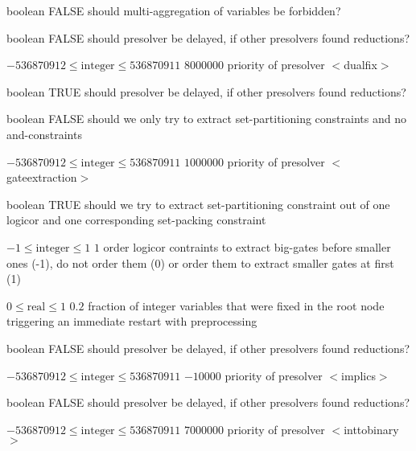 %
{boolean}%
{FALSE}%
{should multi-aggregation of variables be forbidden?}%
{}

%
{boolean}%
{FALSE}%
{should presolver be delayed, if other presolvers found reductions?}%
{}

%
{$-536870912\leq\textrm{integer}\leq536870911$}%
{$8000000$}%
{priority of presolver $<$dualfix$>$}%
{}

%
{boolean}%
{TRUE}%
{should presolver be delayed, if other presolvers found reductions?}%
{}

%
{boolean}%
{FALSE}%
{should we only try to extract set-partitioning constraints and no and-constraints}%
{}

%
{$-536870912\leq\textrm{integer}\leq536870911$}%
{$1000000$}%
{priority of presolver $<$gateextraction$>$}%
{}

%
{boolean}%
{TRUE}%
{should we try to extract set-partitioning constraint out of one logicor and one corresponding set-packing constraint}%
{}

%
{$-1\leq\textrm{integer}\leq1$}%
{$1$}%
{order logicor contraints to extract big-gates before smaller ones (-1), do not order them (0) or order them to extract smaller gates at first (1)}%
{}

%
{$0\leq\textrm{real}\leq1$}%
{$0.2$}%
{fraction of integer variables that were fixed in the root node triggering an immediate restart with preprocessing}%
{}

%
{boolean}%
{FALSE}%
{should presolver be delayed, if other presolvers found reductions?}%
{}

%
{$-536870912\leq\textrm{integer}\leq536870911$}%
{$-10000$}%
{priority of presolver $<$implics$>$}%
{}

%
{boolean}%
{FALSE}%
{should presolver be delayed, if other presolvers found reductions?}%
{}

%
{$-536870912\leq\textrm{integer}\leq536870911$}%
{$7000000$}%
{priority of presolver $<$inttobinary$>$}%
{}

